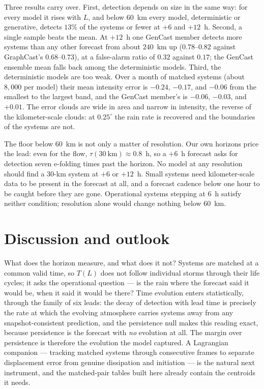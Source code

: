 \documentclass[draft]{agujournal2019}
\begin{document}
Three results carry over. First, detection depends on size in the same
way: for every model it rises with $L$, and below $60$~km every model,
deterministic or generative, detects $13\%$ of the systems or fewer at
$+6$ and $+12$~h. Second, a single sample beats the mean. At $+12$~h one
GenCast member detects more systems than any other forecast from about
$240$~km up ($0.78$--$0.82$ against GraphCast's $0.68$--$0.73$), at a
false-alarm ratio of $0.32$ against $0.17$; the GenCast ensemble mean
falls back among the deterministic models. Third, the deterministic models
are too weak. Over a month of matched systems (about $8{,}000$ per model)
their mean intensity error is $-0.24$, $-0.17$, and $-0.06$ from the
smallest to the largest band, and the GenCast member's is $-0.06$, $-0.03$,
and $+0.01$. The error clouds are wide in area and narrow in intensity, the
reverse of the kilometer-scale clouds: at $0.25^{\circ}$ the rain rate is
recovered and the boundaries of the systems are not.

The floor below $60$~km is not only a matter of resolution. Our own
horizons price the lead: even for the flow, $\tau(30~\mathrm{km})
\approx 0.8$~h, so a $+6$~h forecast asks for detection seven e-folding
times past the horizon. No model at any resolution should find a $30$-km
system at $+6$ or $+12$~h. Small systems need kilometer-scale data to be
present in the forecast at all, and a forecast cadence below one hour to
be caught before they are gone. Operational systems stepping at $6$~h
satisfy neither condition; resolution alone would change nothing below
$60$~km.

\section{Discussion and outlook}\label{sec:discussion}

What does the horizon measure, and what does it not? Systems are matched at
a common valid time, so $T(L)$ does not follow individual storms through
their life cycles; it asks the operational question --- is the rain where the
forecast said it would be, when it said it would be there? Time evolution
enters statistically, through the family of six leads: the decay of
detection with lead time is precisely the rate at which the evolving
atmosphere carries systems away from any snapshot-consistent prediction, and
the persistence null makes this reading exact, because persistence is the
forecast with \emph{no} evolution at all. The margin over persistence is
therefore the evolution the model captured. A Lagrangian companion ---
tracking matched systems through consecutive frames to separate displacement
error from genuine dissipation and initiation --- is the natural next
instrument, and the matched-pair tables built here already contain the
centroids it needs.
\end{document}
